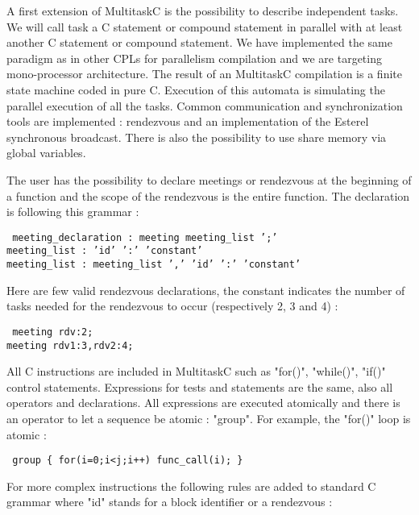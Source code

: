 \documentclass[10pt]{report}
\begin{document}
A first extension of MultitaskC is the possibility to describe independent tasks. We will call task a C statement or
compound statement in parallel with at least another C statement or compound statement. We have implemented the same
paradigm as in other CPLs for parallelism compilation and we are targeting mono-processor architecture. The result of
an MultitaskC compilation is a finite state machine coded in pure C. Execution of this automata is simulating
the parallel execution of all the tasks. Common communication and synchronization tools are implemented : rendezvous
and an implementation of the Esterel synchronous broadcast. There is also the possibility to use share
memory via global variables.

The user has the possibility to declare meetings or rendezvous at the beginning of a function and the scope
of the rendezvous is the entire function. The declaration is following this grammar :

\begin{table}[h!]
\tt
\footnotesize
meeting\_declaration : meeting meeting\_list ';'\\
meeting\_list : 'id' ':' 'constant'\\
meeting\_list : meeting\_list ',' 'id' ':' 'constant'\\
\end{table}

Here are few valid rendezvous declarations, the constant indicates the number of tasks needed for the rendezvous to
occur (respectively 2, 3 and 4) :

\begin{table}[h!]
\tt
\footnotesize
meeting rdv:2;\\
meeting rdv1:3,rdv2:4;\\
\end{table}

All C instructions are included in MultitaskC such as "for()", "while()", "if()" control statements. Expressions for
tests and statements are the same, also all operators and declarations. All expressions are executed atomically and
there is an operator to let a sequence be atomic : "group". For example, the "for()" loop is atomic :

\begin{table}[h!]
\tt
\footnotesize
group \{ for(i=0;i<j;i++) func\_call(i); \}
\end{table}

For more complex instructions the following rules are added to standard C grammar where "id" stands for a block
identifier or a rendezvous :
\end{document}
